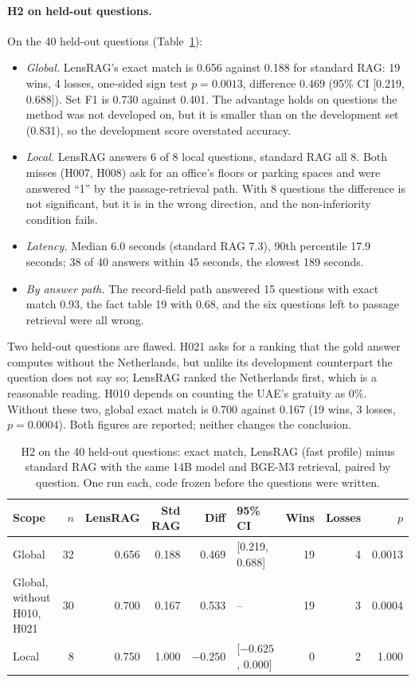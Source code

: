 \documentclass[11pt,letterpaper,oneside]{report}
\begin{document}
\paragraph{H2 on held-out questions.}
On the 40 held-out questions (Table~\ref{tab:heldout}):
\begin{itemize}
  \item \emph{Global.} LensRAG's exact match is 0.656 against 0.188 for
  standard RAG: 19 wins, 4 losses, one-sided sign test $p=0.0013$,
  difference 0.469 (95\% CI [0.219, 0.688]). Set F1 is 0.730 against 0.401.
  The advantage holds on questions the method was not developed on, but it
  is smaller than on the development set (0.831), so the development score
  overstated accuracy.
  \item \emph{Local.} LensRAG answers 6 of 8 local questions, standard RAG
  all 8. Both misses (H007, H008) ask for an office's floors or parking
  spaces and were answered ``1'' by the passage-retrieval path. With 8
  questions the difference is not significant, but it is in the wrong
  direction, and the non-inferiority condition fails.
  \item \emph{Latency.} Median 6.0 seconds (standard RAG 7.3), 90th
  percentile 17.9 seconds; 38 of 40 answers within 45 seconds, the slowest
  189 seconds.
  \item \emph{By answer path.} The record-field path answered 15 questions
  with exact match 0.93, the fact table 19 with 0.68, and the six questions
  left to passage retrieval were all wrong.
\end{itemize}
Two held-out questions are flawed. H021 asks for a ranking that the gold
answer computes without the Netherlands, but unlike its development
counterpart the question does not say so; LensRAG ranked the Netherlands
first, which is a reasonable reading. H010 depends on counting the UAE's
gratuity as 0\%. Without these two, global exact match is 0.700 against
0.167 (19 wins, 3 losses, $p=0.0004$). Both figures are reported; neither
changes the conclusion.

\begin{table}[htbp]
\centering\small
\caption{H2 on the 40 held-out questions: exact match, LensRAG (fast
profile) minus standard RAG with the same 14B model and BGE-M3 retrieval,
paired by question. One run each, code frozen before the questions were
written.}
\label{tab:heldout}
\begin{tabular}{@{}lrrrrlrrr@{}}
\toprule
Scope & $n$ & LensRAG & Std RAG & Diff & 95\% CI & Wins & Losses & $p$ \\
\midrule
Global & 32 & 0.656 & 0.188 & 0.469 & [0.219, 0.688] & 19 & 4 & 0.0013 \\
Global, without H010, H021 & 30 & 0.700 & 0.167 & 0.533 & -- & 19 & 3 & 0.0004 \\
Local & 8 & 0.750 & 1.000 & $-0.250$ & [$-0.625$, 0.000] & 0 & 2 & 1.000 \\
\bottomrule
\end{tabular}
\end{table}
\end{document}
